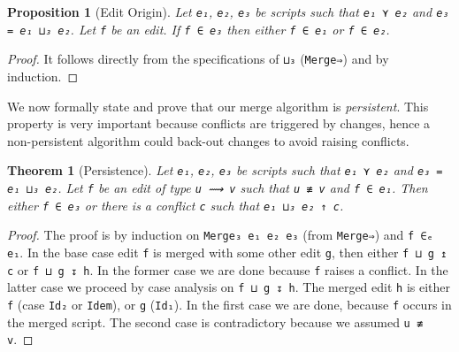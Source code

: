 \documentclass[preprint]{sigplanconf}
\theoremstyle{plain}
\newtheorem{thm}{Theorem}
\newtheorem{prop}{Proposition}
\begin{document}
\begin{prop}[Edit Origin]
Let \texttt{e₁}, \texttt{e₂}, \texttt{e₃} be scripts such that
\texttt{e₁ ⋎ e₂} and \texttt{e₃ = e₁ ⊔₃ e₂}. Let \texttt{f} be an edit.
If \texttt{f ∈ e₃} then either \texttt{f ∈ e₁} or \texttt{f ∈ e₂}.
\end{prop}
\begin{proof}
  It follows directly from the specifications of \texttt{⊔₃}
  (\texttt{Merge⇒}) and by induction.
\end{proof}

  We now formally state and prove that our merge algorithm is \emph{persistent}.
  This property is very important because conflicts are triggered by changes,
  hence a non-persistent algorithm could back-out changes to avoid raising
  conflicts.


				
\begin{thm}[Persistence]
Let \texttt{e₁}, \texttt{e₂}, \texttt{e₃} be scripts such that
\texttt{e₁ ⋎ e₂} and \texttt{e₃ = e₁ ⊔₃ e₂}. Let \texttt{f} be an edit
of type \texttt{u ⟿ v} such that \texttt{u ≢ v} and \texttt{f ∈ e₁}.
Then either \texttt{f ∈ e₃} or there is a conflict \texttt{c} such that
\texttt{e₁ ⊔₃ e₂ ↑ c}.
\end{thm}
\begin{proof}
    The proof is by induction on \texttt{Merge₃ e₁ e₂ e₃} (from
    \texttt{Merge⇒}) and \texttt{f ∈ₑ e₁}.  In the base case edit
    \texttt{f} is merged with some other edit \texttt{g}, then either
    \texttt{f ⊔ g ↥ c} or \texttt{f ⊔ g ↧ h}.
    In the former case we are done because \texttt{f} raises a
    conflict.  In the latter case we proceed by case analysis on
    \texttt{f ⊔ g ↧ h}.
    The merged edit \texttt{h} is either \texttt{f} (case \texttt{Id₂}
    or \texttt{Idem}), or \texttt{g} (\texttt{Id₁}). In the first case
    we are done, because \texttt{f} occurs in the merged script.
    The second case is contradictory because we assumed \texttt{u ≢
      v}.
\end{proof}        
\end{document}
